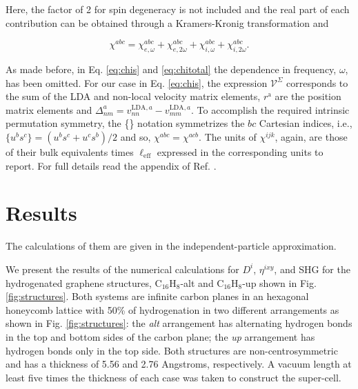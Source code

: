 \documentclass[pss]{wiley2sp} %
\begin{document}
\noindent Here, the factor of 2 for spin degeneracy is not included and the real part of each contribution can be obtained through a Kramers-Kronig transformation \cite{tancogne2014effect} and

\begin{equation}\label{eq:chitotal}
    \chi^{abc} = \chi^{abc}_{e,\omega} + \chi^{abc}_{e,2\omega} +
    \chi^{abc}_{i,\omega} + \chi^{abc}_{i,2\omega}
    .
\end{equation}

As made before, in Eq. \ref{eq:chis} and \ref{eq:chitotal} the dependence in
frequency, $\omega$, has been omitted. For our case in Eq. \ref{eq:chis}, the
expression $\mathcal{V}^{\Sigma}$ corresponds to the sum of the LDA and 
non-local velocity matrix elements, $r^{\mathrm{a}} $ are the position matrix
elements and $\Delta^{a}_{nm} = v^{\text{LDA},a}_{nn} - v^{\text{LDA},a}_{mm}
$. To accomplish the required intrinsic permutation symmetry, the \{\} notation
symmetrizes the $bc$ Cartesian indices, i.e., $\{u^{b}s^{c}\} = (u^{b}s^{c} +
u^{c}s^{b})/{2}$ and so, $\chi^{abc} = \chi^{acb}$. The units of $\chi^{ijk} $,
again, are those of their bulk equivalents times $\ell_{\text{eff}}$ expressed
in the corresponding units to report. For full details read the appendix of
Ref. \cite{anderson2015theory}.


\section{Results}\label{sec:results}

\begin{changed}
The calculations of them are given in the independent-particle approximation.
\end{changed}

We present the results of the numerical calculations for {$D^{i}$}, {$\eta^{ixy}$}, and SHG for
the hydrogenated graphene structures, C$_{16}$H$_{8}$-alt and C$_{16}$H$_{8}$-up shown in Fig.
\ref{fig:structures}. Both systems are infinite carbon planes in an
hexagonal honeycomb lattice with 50\% of hydrogenation in two different
arrangements as shown in Fig. \ref{fig:structures}: the \emph{alt} arrangement has
alternating hydrogen bonds in the top and bottom sides of the carbon plane; the
\emph{up} arrangement has hydrogen bonds only in the top
side. Both structures are non-centrosymmetric and has a thickness of 5.56 and
2.76 Angstroms, respectively. A vacuum length at least  five times the
thickness of each case was taken to construct the super-cell.
\end{document}
